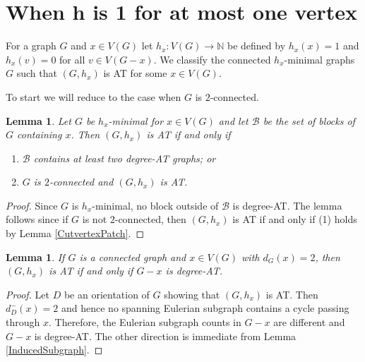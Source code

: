 \documentclass[12pt]{article}
\theoremstyle{plain}
\newtheorem{lem}[thm]{Lemma}
\theoremstyle{definition}
\theoremstyle{remark}
\newcommand{\fancy}[1]{\mathcal{#1}}
\newcommand{\IN}{\mathbb{N}}
\newcommand{\func}[3]{#1\colon #2 \rightarrow #3}
\def\B{\fancy{B}}
\begin{document}
\section{When h is 1 for at most one vertex}
For a graph $G$ and $x \in V(G)$ let $\func{h_x}{V(G)}{\IN}$ be defined by $h_x(x) = 1$ and $h_x(v) = 0$ for all $v \in V(G-x)$. We classify the connected $h_x$-minimal graphs $G$ such that $(G,h_x)$ is AT for some $x \in V(G)$. 

To start we will reduce to the case when $G$ is $2$-connected.
\begin{lem}\label{TwoConnectedReduction}
	Let $G$ be $h_x$-minimal for $x \in V(G)$ and let $\B$ be the set of blocks of $G$ containing $x$.  Then $(G,h_x)$ is AT if and only if
	\begin{enumerate}
		\item $\B$ contains at least two degree-AT graphs; or
		\item $G$ is $2$-connected and $(G, h_x)$ is AT.
	\end{enumerate}
\end{lem}
\begin{proof}
	Since $G$ is $h_x$-minimal, no block outside of $\B$ is degree-AT.  The lemma follows since if $G$ is not $2$-connected, then $(G,h_x)$ is AT if and only if (1) holds by Lemma \ref{CutvertexPatch}.
\end{proof}

\begin{lem}\label{DegreeTwoVertex}
	If $G$ is a connected graph and $x \in V(G)$ with $d_G(x) = 2$, then $(G,h_x)$ is AT if and only if $G-x$ is degree-AT.
\end{lem}
\begin{proof}
	Let $D$ be an orientation of $G$ showing that $(G,h_x)$ is AT.  Then $d_{D}^-(x) = 2$ and hence no spanning Eulerian subgraph contains a cycle passing through $x$.  Therefore, the Eulerian subgraph counts in $G-x$ are different and $G-x$ is degree-AT.
	The other direction is immediate from Lemma \ref{InducedSubgraph}.
\end{proof}
\end{document}
